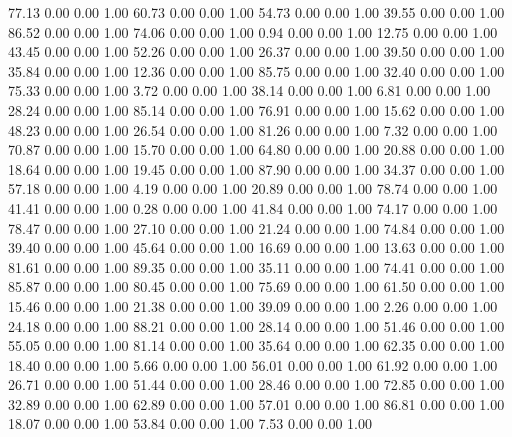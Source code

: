    77.13   0.00   0.00   1.00
   60.73   0.00   0.00   1.00
   54.73   0.00   0.00   1.00
   39.55   0.00   0.00   1.00
   86.52   0.00   0.00   1.00
   74.06   0.00   0.00   1.00
    0.94   0.00   0.00   1.00
   12.75   0.00   0.00   1.00
   43.45   0.00   0.00   1.00
   52.26   0.00   0.00   1.00
   26.37   0.00   0.00   1.00
   39.50   0.00   0.00   1.00
   35.84   0.00   0.00   1.00
   12.36   0.00   0.00   1.00
   85.75   0.00   0.00   1.00
   32.40   0.00   0.00   1.00
   75.33   0.00   0.00   1.00
    3.72   0.00   0.00   1.00
   38.14   0.00   0.00   1.00
    6.81   0.00   0.00   1.00
   28.24   0.00   0.00   1.00
   85.14   0.00   0.00   1.00
   76.91   0.00   0.00   1.00
   15.62   0.00   0.00   1.00
   48.23   0.00   0.00   1.00
   26.54   0.00   0.00   1.00
   81.26   0.00   0.00   1.00
    7.32   0.00   0.00   1.00
   70.87   0.00   0.00   1.00
   15.70   0.00   0.00   1.00
   64.80   0.00   0.00   1.00
   20.88   0.00   0.00   1.00
   18.64   0.00   0.00   1.00
   19.45   0.00   0.00   1.00
   87.90   0.00   0.00   1.00
   34.37   0.00   0.00   1.00
   57.18   0.00   0.00   1.00
    4.19   0.00   0.00   1.00
   20.89   0.00   0.00   1.00
   78.74   0.00   0.00   1.00
   41.41   0.00   0.00   1.00
    0.28   0.00   0.00   1.00
   41.84   0.00   0.00   1.00
   74.17   0.00   0.00   1.00
   78.47   0.00   0.00   1.00
   27.10   0.00   0.00   1.00
   21.24   0.00   0.00   1.00
   74.84   0.00   0.00   1.00
   39.40   0.00   0.00   1.00
   45.64   0.00   0.00   1.00
   16.69   0.00   0.00   1.00
   13.63   0.00   0.00   1.00
   81.61   0.00   0.00   1.00
   89.35   0.00   0.00   1.00
   35.11   0.00   0.00   1.00
   74.41   0.00   0.00   1.00
   85.87   0.00   0.00   1.00
   80.45   0.00   0.00   1.00
   75.69   0.00   0.00   1.00
   61.50   0.00   0.00   1.00
   15.46   0.00   0.00   1.00
   21.38   0.00   0.00   1.00
   39.09   0.00   0.00   1.00
    2.26   0.00   0.00   1.00
   24.18   0.00   0.00   1.00
   88.21   0.00   0.00   1.00
   28.14   0.00   0.00   1.00
   51.46   0.00   0.00   1.00
   55.05   0.00   0.00   1.00
   81.14   0.00   0.00   1.00
   35.64   0.00   0.00   1.00
   62.35   0.00   0.00   1.00
   18.40   0.00   0.00   1.00
    5.66   0.00   0.00   1.00
   56.01   0.00   0.00   1.00
   61.92   0.00   0.00   1.00
   26.71   0.00   0.00   1.00
   51.44   0.00   0.00   1.00
   28.46   0.00   0.00   1.00
   72.85   0.00   0.00   1.00
   32.89   0.00   0.00   1.00
   62.89   0.00   0.00   1.00
   57.01   0.00   0.00   1.00
   86.81   0.00   0.00   1.00
   18.07   0.00   0.00   1.00
   53.84   0.00   0.00   1.00
    7.53   0.00   0.00   1.00
